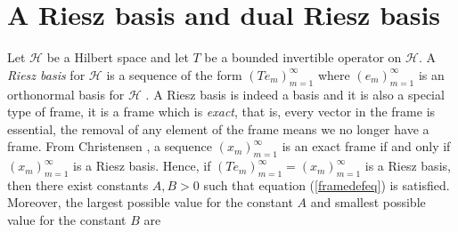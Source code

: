 \documentclass[10pt, reqno]{amsart}
\theoremstyle{definition}
\numberwithin{equation}{section}
\begin{document}




  

\section{A Riesz basis and dual Riesz basis}\label{constructblaschke}

Let $\mathcal{H}$ be a Hilbert space and let $T$ be a bounded invertible operator on $\mathcal{H}$. A {\it{Riesz basis}} for $\mathcal{H}$ is a sequence of the form $(Te_{m})_{m=1}^{\infty}$ where $(e_{m})_{m=1}^{\infty}$ is an orthonormal basis for $\mathcal{H}$ \cite[Definition 3.6.1]{Christensen}. A Riesz basis is indeed a basis and it is also a special type of frame, it is a frame which is {\it{exact}}, that is, every vector in the frame is essential, the removal of any element of the frame means we no longer have a frame. From Christensen \cite[Theorem 7.11]{Christensen}, a sequence $(x_{m})_{m=1}^{\infty}$ is an exact frame if and only if $(x_{m})_{m=1}^{\infty}$ is a Riesz basis. Hence, if $(Te_{m})_{m=1}^{\infty} = (x_{m})_{m=1}^{\infty}$ is a Riesz basis, then there exist constants $A,B>0$ such that equation (\ref{framedefeq}) is satisfied. Moreover, the largest possible value for the constant $A$ and smallest possible value for the constant $B$ are
\end{document}
